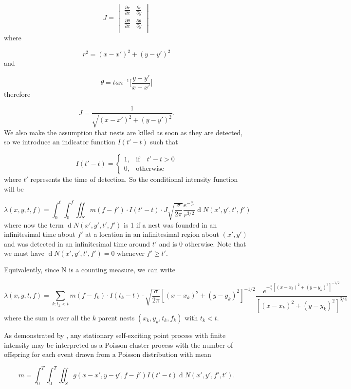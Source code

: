 \documentclass[11pt,a4paper]{article}
\renewcommand{\d}[1]{\ensuremath{\operatorname{d}\!{#1}}}
\begin{document}
\[
J =  
\begin{vmatrix}
	\frac{\partial r}{\partial x} & \frac{\partial r}{\partial y} \\
	\frac{\partial \theta}{\partial x} & \frac{\partial \theta}{\partial y} \\
\end{vmatrix}
\]
where

\[
r^{2} = (x - x')^{2} + (y - y')^{2}
\]
and

\[
\theta = tan^{-1} \Bigg [\frac{y - y'}{x - x'} \Bigg ]
\]
therefore

\[
J = \frac{1}{\sqrt{(x - x')^{2} + (y - y')^{2}}}.
\]
We also make the assumption that nests are killed as soon as they are detected, so we introduce an indicator function $I(t' - t)$ such that

\[
I (t' - t) =
\begin{cases}
1, & \mbox{if} \quad t' -  t> 0 \\
0, & \mbox{otherwise}
\end{cases}
\]
where $t'$ represents the time of detection. So the conditional intensity function will be

\[
\lambda(x, y, t, f) = \int_{0}^{t} \int_{0}^{f} \iint_{S} m(f - f') \cdot I(t' - t)\cdot J \sqrt{\frac{\sigma}{2 \pi}} \frac{e^{- \frac{\sigma}{ 2 r}}}{r^{3/2}} \d N(x',y',t',f')
\]
where now the term $\d N(x',y',t',f')$ is 1 if a nest was founded in an infinitesimal time about $f'$ at a location in an infinitesimal region about $(x', y')$ and was detected in an infinitesimal time around $t'$ and is $0$ otherwise. Note that we must have $\d N(x',y',t',f')=0$ whenever $f' \geq t'$.

{\color{red} Equivalently, since N is a counting measure, we can write

\[
\lambda(x, y, t, f) = \sum_{ k: t_k < t } m(f - f_k) \cdot I(t_k - t)\cdot \sqrt{\frac{\sigma}{2 \pi}} [{(x - x_k)^{2} + (y - y_k)^{2}}]^{-1/2} \frac{e^{- \frac{\sigma}{2} [(x - x_k)^{2} + (y - y_k)^{2}]^{-1/2}}}{[(x - x_k)^{2} + (y - y_k)^{2}]^{3/4}}
\]
where the sum is over all the $k$ parent nests $(x_k, y_k, t_k, f_k)$ with $t_k < t$.

As demonstrated by \cite{Hawkes74}, any stationary self-exciting point process with finite intensity may be interpreted as a Poisson cluster process with the number of offspring for each event drawn from a Poisson distribution with mean 

\begin{equation} \label{eq:NumOffsp}
    m = \int_0^T \int_0^T \iint_S g(x-x', y-y', f-f') I(t' - t) \d N(x', y', f', t').
\end{equation}}
\end{document}
